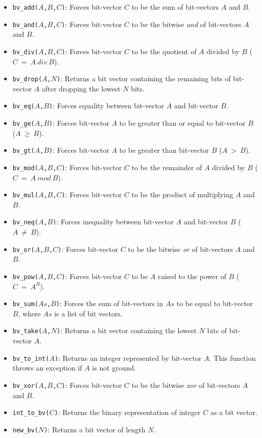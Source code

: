 \begin{itemize}
\item \texttt{bv\_add($A$,$B$,$C$)}: Forces bit-vector $C$ to be the sum of bit-vectors $A$ and $B$.
\item \texttt{bv\_and($A$,$B$,$C$)}: Forces bit-vector $C$ to be the bitwise \textit{and} of bit-vectors $A$ and $B$.
\item \texttt{bv\_div($A$,$B$,$C$)}: Forces bit-vector $C$ to be the quotient of $A$ divided by $B$ ($C\ =\ A\ div\ B$).
\item \texttt{bv\_drop($A$,$N$)}: Returns a bit vector containing the remaining bits of bit-vector $A$ after dropping the lowest $N$ bits.
\item \texttt{bv\_eq($A$,$B$)}: Forces equality between bit-vector $A$ and bit-vector $B$.
\item \texttt{bv\_ge($A$,$B$)}: Forces bit-vector $A$ to be greater than or equal to bit-vector $B$ ($A\ \ge\ B$).
\item \texttt{bv\_gt($A$,$B$)}: Forces bit-vector $A$ to be greater than bit-vector $B$ ($A\ >\ B$).
\item \texttt{bv\_mod($A$,$B$,$C$)}: Forces bit-vector $C$ to be the remainder of $A$ divided by $B$ ($C\ =\ A\ mod\ B$).
\item \texttt{bv\_mul($A$,$B$,$C$)}: Forces bit-vector $C$ to be the product of multiplying $A$ and $B$.
\item \texttt{bv\_neq($A$,$B$)}: Forces inequality between bit-vector $A$ and bit-vector $B$ ($A\ \neq\ B$).
\item \texttt{bv\_or($A$,$B$,$C$)}: Forces bit-vector $C$ to be the bitwise \textit{or} of bit-vectors $A$ and $B$.
\item \texttt{bv\_pow($A$,$B$,$C$)}: Forces bit-vector $C$ to be $A$ raised to the power of $B$ ($C\ =\ A^B$).
\item \texttt{bv\_sum($As$,$B$)}: Forces the sum of bit-vectors in $As$ to be equal to bit-vector $B$, where $As$ is a list of bit vectors.
\item \texttt{bv\_take($A$,$N$)}: Returns a bit vector containing the lowest $N$ bits of bit-vector $A$.
\item \texttt{bv\_to\_int($A$)}: Returns an integer represented by bit-vector $A$. This function throws an exception if $A$ is not ground.
\item \texttt{bv\_xor($A$,$B$,$C$)}: Forces bit-vector $C$ to be the bitwise \textit{xor} of bit-vectors $A$ and $B$.
\item \texttt{int\_to\_bv($C$)}: Returns the binary representation of integer $C$ as a bit vector.
\item \texttt{new\_bv($N$)}: Returns a bit vector of length $N$.
\end{itemize}

